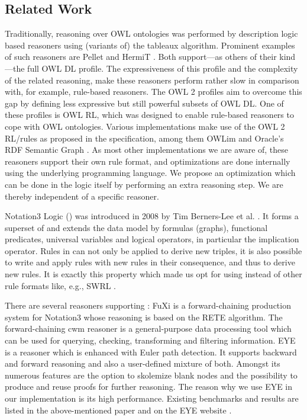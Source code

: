 \subsection{Related Work}\label{relwork}


Traditionally, reasoning over OWL ontologies was performed by description logic based reasoners using (variants of) the tableaux algorithm.
Prominent examples of such reasoners are Pellet \cite{Pellet} and HermiT \cite{hermit}. 
Both support---as others of their kind---the full OWL DL profile. The expressiveness of this profile and the complexity of the related reasoning,
make these reasoners perform rather slow in comparison with, for example, rule-based reasoners. The OWL 2 profiles \cite{OWLRL} aim to overcome this gap 
by defining less expressive
but still powerful subsets of OWL DL. One of these profiles is OWL RL, which was designed to enable rule-based reasoners to cope with OWL ontologies. 
Various implementations make use of 
the OWL 2 RL/\rdf rules as proposed in the specification, among them
 OWLim \cite{owlim} and Oracle's RDF Semantic Graph \cite{oracle}. 
As most other implementations we are aware of, these reasoners support their own rule format, 
and optimizations are done internally using
the underlying programming language. 
We propose an optimization which can be done in the logic itself by performing an extra reasoning step.
We are thereby independent of a specific reasoner.

 
 
Notation3 Logic (\nthree) was introduced in 2008 by Tim Berners-Lee et al. \cite{N3Logic}.
It forms a superset of \rdf and extends the \rdf data model by formulas (graphs), functional predicates, universal variables and logical operators, in particular
the implication operator. Rules in \nthree can not only be applied to derive new \rdf triples, it is also possible to write and apply rules with new rules in 
their consequence, and thus to derive new rules. It is exactly this property which made us opt for using \nthree instead of other 
rule formats like, e.g., SWRL \cite{swrl}.

There are several reasoners supporting \nthree:
FuXi \cite{fuxi} is a forward-chaining production system for Notation3 whose reasoning is based on the RETE algorithm. 
The forward-chaining cwm \cite{cwm} reasoner 
is a general-purpose data processing tool which can be used for querying, checking, transforming 
and filtering information.
EYE \cite{eyepaper} is a reasoner which is enhanced with Euler path detection. 
It supports 
backward and 
forward 
reasoning and also a user-defined mixture of both. 
Amongst its 
numerous features are the option to skolemize blank nodes
and  the possibility to produce and reuse proofs for further reasoning. 
The reason why we use EYE in our implementation is its high performance. 
Existing benchmarks and results are listed in the above-mentioned paper \cite{eyepaper} and on the EYE website \cite{eye}.



